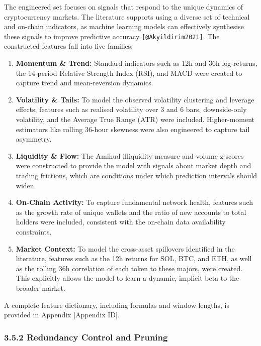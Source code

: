 \documentclass[
  a4paper,
  DIV=11,
  numbers=noendperiod]{scrreprt}
\providecommand{\tightlist}{%
  \setlength{\itemsep}{0pt}\setlength{\parskip}{0pt}}
\begin{document}
The engineered set focuses on signals that respond to the unique
dynamics of cryptocurrency markets. The literature supports using a
diverse set of technical and on-chain indicators, as machine learning
models can effectively synthesise these signals to improve predictive
accuracy \texttt{{[}@Akyildirim2021{]}}. The constructed features fall
into five families:

\begin{enumerate}
\def\labelenumi{\arabic{enumi}.}
\tightlist
\item
  \textbf{Momentum \& Trend:} Standard indicators such as 12h and 36h
  log-returns, the 14-period Relative Strength Index (RSI), and MACD
  were created to capture trend and mean-reversion dynamics.
\item
  \textbf{Volatility \& Tails:} To model the observed volatility
  clustering and leverage effects, features such as realised volatility
  over 3 and 6 bars, downside-only volatility, and the Average True
  Range (ATR) were included. Higher-moment estimators like rolling
  36-hour skewness were also engineered to capture tail asymmetry.
\item
  \textbf{Liquidity \& Flow:} The Amihud illiquidity measure and volume
  z-scores were constructed to provide the model with signals about
  market depth and trading frictions, which are conditions under which
  prediction intervals should widen.
\item
  \textbf{On-Chain Activity:} To capture fundamental network health,
  features such as the growth rate of unique wallets and the ratio of
  new accounts to total holders were included, consistent with the
  on-chain data availability constraints.
\item
  \textbf{Market Context:} To model the cross-asset spillovers
  identified in the literature, features such as the 12h returns for
  SOL, BTC, and ETH, as well as the rolling 36h correlation of each
  token to these majors, were created. This explicitly allows the model
  to learn a dynamic, implicit beta to the broader market.
\end{enumerate}

A complete feature dictionary, including formulas and window lengths, is
provided in Appendix {[}Appendix ID{]}.

\subsubsection{3.5.2 Redundancy Control and
Pruning}\label{redundancy-control-and-pruning}
\end{document}
